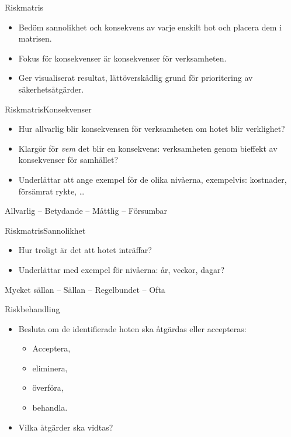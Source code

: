 \documentclass{beamer}
\begin{document}
\begin{frame}{Riskmatris}
  \begin{itemize}
    \item Bedöm sannolikhet och konsekvens av varje enskilt hot och placera dem 
      i matrisen.
    \item Fokus för konsekvenser är konsekvenser för verksamheten.
    \item Ger visualiserat resultat, lättöverskådlig grund för prioritering av 
      säkerhetsåtgärder.
  \end{itemize}
\end{frame}

\begin{frame}{Riskmatris}{Konsekvenser}
  \begin{itemize}
    \item Hur allvarlig blir konsekvensen för verksamheten om hotet blir 
      verklighet?
    \item Klargör för \emph{vem} det blir en konsekvens: verksamheten genom 
      bieffekt av konsekvenser för samhället?
    \item Underlättar att ange exempel för de olika nivåerna, exempelvis: 
      kostnader, försämrat rykte, \dots
  \end{itemize}
  \begin{center}
    Allvarlig -- Betydande -- Måttlig -- Försumbar
  \end{center}
\end{frame}

\begin{frame}{Riskmatris}{Sannolikhet}
  \begin{itemize}
    \item Hur troligt är det att hotet inträffar?
    \item Underlättar med exempel för nivåerna: år, veckor, dagar?
  \end{itemize}
  \begin{center}
    Mycket sällan -- Sällan -- Regelbundet -- Ofta
  \end{center}
\end{frame}

\begin{frame}{Riskbehandling}
  \begin{itemize}
    \item Besluta om de identifierade hoten ska åtgärdas eller accepteras:
      \begin{itemize}
        \item Acceptera,
        \item eliminera,
        \item överföra,
        \item behandla.
      \end{itemize}
    \item Vilka åtgärder ska vidtas?
  \end{itemize}
\end{frame}
\end{document}
